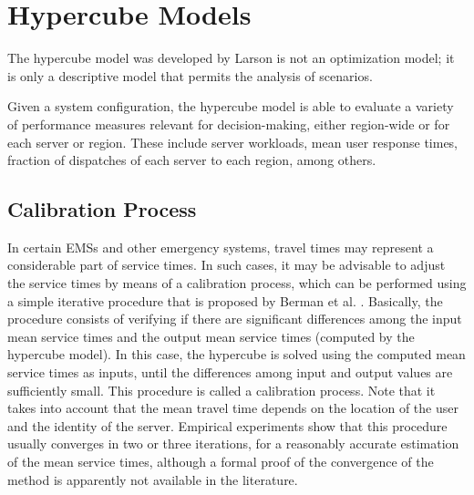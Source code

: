 \section{Hypercube Models}
The hypercube model
was developed by Larson \cite{larson1974hypercube}
is not an optimization model; 
it is only a descriptive model
that permits the analysis of scenarios.

Given a system configuration,
the hypercube model
is able to evaluate
a variety of performance measures relevant for decision-making,
either region-wide or for each server or region. 
These include
server workloads,
mean user response times,
fraction of dispatches of each server to each region,
among others.

\subsection{Calibration Process}
In certain EMSs
and other emergency systems,
travel times may represent
a considerable part of service times.
In such cases,
it may be advisable
to adjust the service times
by means of a calibration process,
which can be performed
using a simple iterative procedure
that is proposed by Berman et al. \cite{berman1987stochastic}.
Basically,
the procedure consists of
verifying
if there are
significant differences among the input mean service times
and the output mean service times (computed by the hypercube model).
In this case,
the hypercube is solved
using the computed mean service times as inputs,
until
the differences
among input and output values
are sufficiently small.
This procedure is called
a calibration process.
Note that
it takes into account
that the mean travel time
depends on the location of the user
and the identity of the server.
Empirical experiments show
that this procedure
usually converges in two or three iterations,
for a reasonably accurate estimation of the mean service times,
although a formal proof of the convergence of the method
is apparently not available in the literature.
